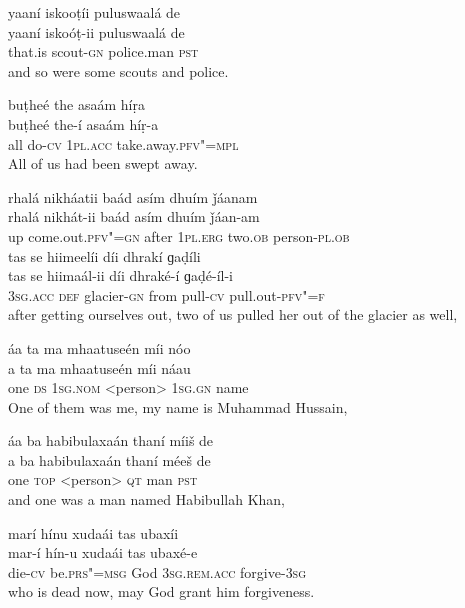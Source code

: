 \begin{exe}
\ex
\label{ex:19}
\glll yaaní	iskooṭíi	puluswaalá	de \\
yaaní	iskoóṭ-ii	puluswaalá	de \\
that.is	scout-\textsc{gn}	police.man \textsc{pst} \\
\glt and so were some scouts and police.

\ex
\label{ex:20}
\glll buṭheé	the	asaám	híṛa \\
buṭheé	the-í	asaám	híṛ-a \\
all	do-\textsc{cv}	\textsc{1pl.acc}	take.away.\textsc{pfv"=mpl} \\
\glt All of us had been swept away.

\ex
\label{ex:21}
\glll rhalá	nikháatii	baád	asím	dhuím	ǰáanam \\
rhalá	nikhát-ii	baád	asím	dhuím	ǰáan-am \\
up	come.out.\textsc{pfv"=gn}	after	\textsc{1pl.erg}	two.\textsc{ob}	person-\textsc{pl.ob} \\
\glll tas	se	hiimeelíi	díi	dhrakí	ɡaḍíli \\
tas	se	hiimaál-ii	díi	dhraké-í	ɡaḍé-íl-i \\
\textsc{3sg.acc} \textsc{def}	glacier-\textsc{gn}	from	pull-\textsc{cv}	pull.out-\textsc{pfv"=f} \\
\glt after getting ourselves out, two of us pulled her out of the glacier as well,

\ex
\label{ex:22}
\glll áa	ta	ma	mhaatuseén	míi	nóo \\
a	ta	ma	mhaatuseén	míi	náau \\
one	\textsc{ds} \textsc{1sg.nom}	<person> \textsc{1sg.gn}	name \\
\glt One of them was me, my name is Muhammad Hussain,

\ex
\label{ex:23}
\glll áa	ba	habibulaxaán	thaní	míiš	de \\
a	ba	habibulaxaán	thaní	méeš	de \\
one \textsc{top}	<person>	\textsc{qt}	man	\textsc{pst} \\
\glt and one was a man named Habibullah Khan,

\ex
\label{ex:24}
\glll marí	hínu	xudaái	tas	ubaxíi \\
mar-í	hín-u	xudaái	tas	ubaxé-e \\
die-\textsc{cv}	be.\textsc{prs"=msg}	God	\textsc{3sg.rem.acc}	forgive-\textsc{3sg} \\
\glt who is dead now, may God grant him forgiveness.


\end{exe}
